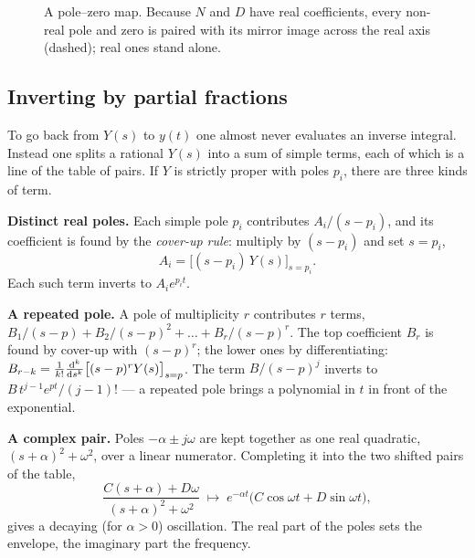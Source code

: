 \documentclass[11pt]{article}
\begin{document}
\begin{figure}[htb]
\centering
{}
\caption{A pole--zero map. Because $N$ and $D$ have real coefficients, every
non-real pole and zero is paired with its mirror image across the real axis
(dashed); real ones stand alone.}
\label{fig:pzmap}
\end{figure}

\subsection{Inverting by partial fractions}\label{sec:pfe}
To go back from $Y(s)$ to $y(t)$ one almost never evaluates an inverse integral.
Instead one splits a rational $Y(s)$ into a sum of simple terms, each of which is
a line of the table of pairs. If $Y$ is strictly proper with poles $p_i$, there
are three kinds of term.

\smallskip\noindent\textbf{Distinct real poles.} Each simple pole $p_i$
contributes $A_i/(s-p_i)$, and its coefficient is found by the \emph{cover-up
rule}: multiply by $(s-p_i)$ and set $s=p_i$,
\begin{equation}\label{eq:coverup}
   A_i = \bigl[(s-p_i)\,Y(s)\bigr]_{s=p_i} .
\end{equation}
Each such term inverts to $A_i e^{p_i t}$.

\smallskip\noindent\textbf{A repeated pole.} A pole of multiplicity $r$
contributes $r$ terms, $B_1/(s-p)+B_2/(s-p)^{2}+\dots+B_r/(s-p)^{r}$. The top
coefficient $B_r$ is found by cover-up with $(s-p)^{r}$; the lower ones by
differentiating: $B_{r-k} = \frac{1}{k!}\frac{\mathrm{d}^{k}}{\mathrm{d} s^{k}}
\bigl[(s-p)^{r}Y(s)\bigr]_{s=p}$. The term $B/(s-p)^{j}$ inverts to
$B\,t^{j-1}e^{pt}/(j-1)!$ --- a repeated pole brings a polynomial in $t$ in front
of the exponential.

\smallskip\noindent\textbf{A complex pair.} Poles $-\alpha\pm j\omega$ are kept
together as one real quadratic, $(s+\alpha)^{2}+\omega^{2}$, over a linear
numerator. Completing it into the two shifted pairs of the table,
\[
   \frac{C(s+\alpha)+D\omega}{(s+\alpha)^{2}+\omega^{2}}
   \;\longmapsto\;
   e^{-\alpha t}\bigl(C\cos\omega t + D\sin\omega t\bigr),
\]
gives a decaying (for $\alpha>0$) oscillation. The real part of the poles sets the
envelope, the imaginary part the frequency.
\end{document}
